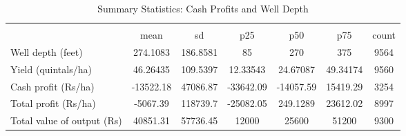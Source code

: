 \begin{table}[htbp]\centering
\def\sym#1{\ifmmode^{#1}\else\(^{#1}\)\fi}
\caption{Summary Statistics: Cash Profits and Well Depth}
\begin{tabular*}{1.0\hsize}{@{\hskip\tabcolsep\extracolsep\fill}l*{1}{cccccc}}
\toprule
                                    &\multicolumn{6}{c}{}                                                         \\
                                    &        mean&          sd&         p25&         p50&         p75&       count\\
\midrule
Well depth (feet)                   &    274.1083&    186.8581&          85&         270&         375&        9564\\
Yield (quintals/ha)                 &    46.26435&    109.5397&    12.33543&    24.67087&    49.34174&        9560\\
Cash profit (Rs/ha)                 &   -13522.18&    47086.87&   -33642.09&   -14057.59&    15419.29&        3254\\
Total profit (Rs/ha)                &    -5067.39&    118739.7&   -25082.05&    249.1289&    23612.02&        8997\\
Total value of output (Rs)          &    40851.31&    57736.45&       12000&       25600&       51200&        9300\\
\bottomrule
\end{tabular*}
\end{table}
